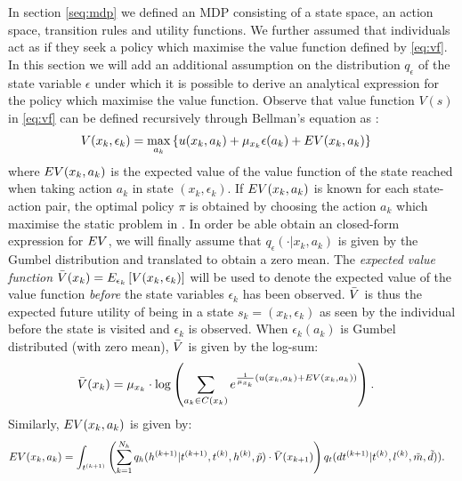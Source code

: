 In section \ref{seq:mdp} we defined an MDP consisting of a state space, an action space, transition rules and utility functions. We further assumed that individuals act as if they seek a policy which maximise the value function defined by \eqref{eq:vf}. In this section we will add an additional assumption on the distribution $q_\epsilon$ of the state variable $\epsilon$ under which it is possible to derive an analytical expression for the policy which maximise the value function. Observe that value function $V(s)$ in \eqref{eq:vf} can be defined recursively through Bellman's equation as \citep{bellman,Rust87}:
\begin{equation} \label{eq:vfbellman}
\begin{aligned}
V(x_k,\epsilon_k) &= \max_{a_k} \left\{\avgu(x_k,a_k) + \mu_{x_k}\epsilon(a_k)+ \eutil(x_k,a_k) \right\} 
\end{aligned}
\end{equation}
where $EV(x_k,a_k) $ is the expected value of the value function of the state reached when taking action $a_k$ in state $(x_k,\epsilon_k)$. If $EV(x_k,a_k)$ is known for each state-action pair, the optimal policy $\pi$ is obtained by choosing the action $a_k$ which maximise the static problem in . In order be able obtain an closed-form expression for $EV$, we will finally assume that $q_\epsilon(\cdot|x_k,a_k)$ is given by the Gumbel distribution and translated to obtain a zero mean. 
The \emph{expected value function} $\bar{V}(x_k) = E_{\epsilon_k} \left[ V(x_k,\epsilon_k) \right]$ will be used to denote the expected value of the value function \emph{before} the state variables $\epsilon_k$ has been observed. $\bar{V}$ is thus the expected future utility of being in a state $s_k = (x_k,\epsilon_k)$ as seen by the individual before the state is visited and $\epsilon_k$ is observed. When $\epsilon_k(a_k)$ is Gumbel distributed (with zero mean), $\bar{V}$ is given by the log-sum:
\begin{equation} \label{eq:evfbellman}
\begin{aligned}
\ev(x_k) &= %
\mu_{x_k}\cdot\log\left(\sum_{a_k\in C(x_{k})} e^{\frac{1}{\mu_{x_k}}\left(\avgu(x_k,a_k) + \eutil(x_k,a_k)\right)}\right).
\end{aligned}
\end{equation}
Similarly, $EV(x_k,a_k)$ is given by:
\begin{equation} \label{eq:vfrust}
\begin{aligned}
    \eutil(x_k,a_k) %
    &= \int_{t\ks{k+1}} \left( \sum_{k=1}^{N_{\amem}}q_\amem(\amem\ks{k+1}|t\ks{k+1}, t\ks{k},\amem\ks{k},\act{p}) \cdot \ev(x_{k+1}) \right)q_t(dt\ks{k+1}|t\ks{k},l\ks{k},\act{m},\act{d})).
\end{aligned}
\end{equation}
